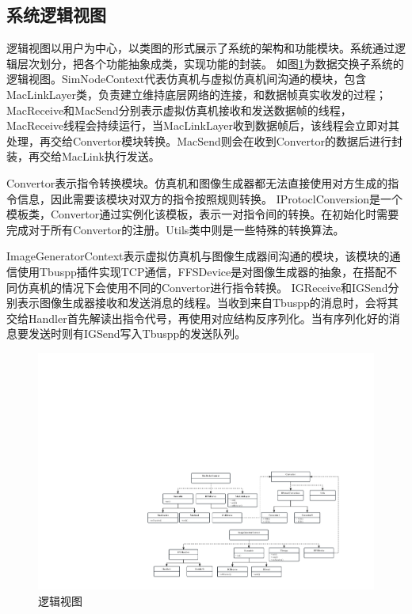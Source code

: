 \subsection{系统逻辑视图}
逻辑视图以用户为中心，以类图的形式展示了系统的架构和功能模块。系统通过逻辑层次划分，把各个功能抽象成类，实现功能的封装。
如图\ref{logic}为数据交换子系统的逻辑视图。SimNodeContext代表仿真机与虚拟仿真机间沟通的模块，包含MacLinkLayer类，负责建立维持底层网络的连接，和数据帧真实收发的过程；
MacReceive和MacSend分别表示虚拟仿真机接收和发送数据帧的线程，MacReceive线程会持续运行，当MacLinkLayer收到数据帧后，该线程会立即对其处理，再交给Convertor模块转换。MacSend则会在收到Convertor的数据后进行封装，再交给MacLink执行发送。
\par
Convertor表示指令转换模块。仿真机和图像生成器都无法直接使用对方生成的指令信息，因此需要该模块对双方的指令按照规则转换。
IProtoclConversion是一个模板类，Convertor通过实例化该模板，表示一对指令间的转换。在初始化时需要完成对于所有Convertor的注册。Utils类中则是一些特殊的转换算法。
\par
ImageGeneratorContext表示虚拟仿真机与图像生成器间沟通的模块，该模块的通信使用Tbuspp插件实现TCP通信，FFSDevice是对图像生成器的抽象，在搭配不同仿真机的情况下会使用不同的Convertor进行指令转换。
IGReceive和IGSend分别表示图像生成器接收和发送消息的线程。当收到来自Tbuspp的消息时，会将其交给Handler首先解读出指令代号，再使用对应结构反序列化。当有序列化好的消息要发送时则有IGSend写入Tbuspp的发送队列。
\begin{figure}[h]
    \begin{center}
        \includegraphics[width=\textwidth]{pictures/logic.pdf}
        \caption{逻辑视图}
        \label{logic}
    \end{center}
\end{figure}
